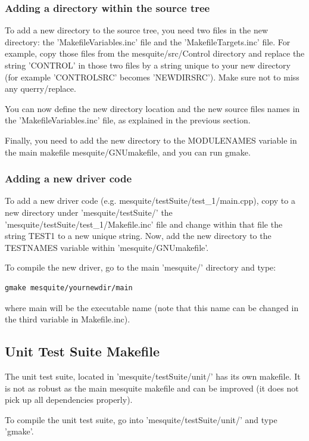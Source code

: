 \documentclass[letter]{report}
\begin{document}
\subsubsection{Adding a directory within the source tree}

To add a new directory to the source tree, you need two files 
in the new directory: the 'MakefileVariables.inc' file and
 the 'MakefileTargets.inc' file. For example, copy those files from 
 the mesquite/src/Control directory and replace the string 'CONTROL' in 
those two files by a string unique to your new directory (for example 
'CONTROLSRC' becomes 'NEWDIRSRC'). Make sure not to miss any querry/replace.

You can now define the new directory location and the new source files 
names in the 'MakefileVariables.inc' file, as explained in the 
previous section.

Finally, you need to add the new directory to the MODULENAMES variable in the main makefile
mesquite/GNUmakefile, and you can run gmake. 

\subsubsection{Adding a new driver code}

To add a new driver code (e.g. mesquite/testSuite/test\_1/main.cpp), 
copy to a new directory under 'mesquite/testSuite/' the
'mesquite/testSuite/test\_1/Makefile.inc' file and change 
within that file the string TEST1 to a new unique string. 
Now, add the new directory to the TESTNAMES variable within 
'mesquite/GNUmakefile'. 

To compile the new driver, go to the main 'mesquite/' directory and type:
\begin{verbatim}
gmake mesquite/yournewdir/main
\end{verbatim}
where main will be the executable name (note that this name can be 
changed in the third variable in Makefile.inc).


\subsection{Unit Test Suite Makefile}

The unit test suite, located in 'mesquite/testSuite/unit/' has its 
own makefile. It is not as robust as the main mesquite makefile and can 
be improved (it does not pick up all dependencies properly).

To compile the unit test suite, go into 'mesquite/testSuite/unit/' 
and type 'gmake'. 
\end{document}
